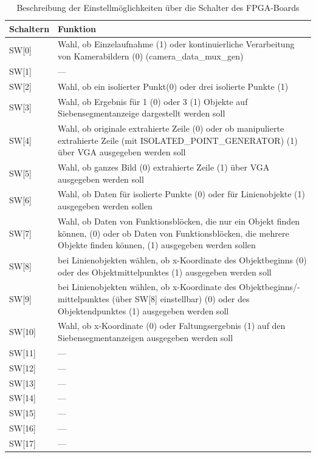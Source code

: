 \documentclass[ngerman,12pt]{article} %
\begin{document}
{\begin{table}[H]
\begin{center}
\caption[Beschreibung der Einstellmöglichkeiten über die Schalter des FPGA-Boards]{\label{tab:Schalterbeschreibung}Beschreibung der Einstellmöglichkeiten über die Schalter des FPGA-Boards}
\begin{tabularx}{\textwidth}{|l|X|}
\hline
Schaltern & Funktion\\
\hline
SW[0]	&Wahl, ob Einzelaufnahme (1) oder kontinuierliche Verarbeitung von Kamerabildern (0) (camera\_data\_mux\_gen)\\
\hline
SW[1]	&---\\
\hline
SW[2]	&Wahl, ob ein isolierter Punkt(0) oder drei isolierte Punkte (1)\\
\hline
SW[3]	&Wahl, ob Ergebnis für 1 (0) oder 3 (1) Objekte auf Siebensegmentanzeige dargestellt werden soll\\
\hline
SW[4]	&Wahl, ob originale extrahierte Zeile (0) oder ob manipulierte extrahierte Zeile (mit ISOLATED\_POINT\_GENERATOR) (1) über VGA ausgegeben werden soll\\
\hline
SW[5]	&Wahl, ob ganzes Bild (0) extrahierte Zeile (1) über VGA ausgegeben werden soll\\
\hline
SW[6]	&Wahl, ob Daten für isolierte Punkte (0) oder für Linienobjekte (1) ausgegeben werden sollen\\
\hline
SW[7]	&Wahl, ob Daten von Funktionsblöcken, die nur ein Objekt finden können, (0) oder ob Daten von Funktionsblöcken, die mehrere Objekte finden können, (1) ausgegeben werden sollen\\
\hline
SW[8]	&bei Linienobjekten wählen, ob x-Koordinate des Objektbeginns (0) oder des Objektmittelpunktes (1) ausgegeben werden soll\\
\hline
SW[9]	&bei Linienobjekten wählen, ob x-Koordinate des Objektbeginns/-mittelpunktes (über SW[8] einstellbar) (0) oder des Objektendpunktes (1) ausgegeben werden soll\\
\hline
SW[10]&Wahl, ob x-Koordinate (0) oder Faltungsergebnis (1) auf den Siebensegmentanzeigen ausgegeben werden soll\\
\hline
SW[11]&---\\
\hline
SW[12]&---\\
\hline
SW[13]&---\\
\hline
SW[14]&---\\
\hline
SW[15]&---\\
\hline
SW[16]&---\\
\hline
SW[17]&---\\
\hline
\end{tabularx}
\end{center}
\end{table}
\clearpage




}
\end{document}
